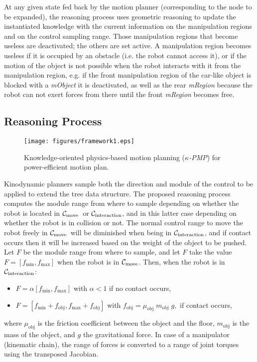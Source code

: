 \documentclass[twocolumn]{svjour3}          %
\newcommand {\Cint}{\hbox{{$\cal C_{\textrm{interaction}}$}}}                %
\newcommand {\Cmove}{\hbox{{$\cal C_{\textrm{move}}$}}}                %
\begin{document}
At any given state fed back by the motion planner (corresponding to the node to be expanded), the reasoning process uses
 geometric reasoning to update the instantiated knowledge with the current information on the manipulation regions and on the control sampling range.
Those manipulation regions  that become useless are deactivated; the others are set active.
A manipulation region becomes useless if it is occupied by an obstacle (i.e. the robot cannot access it), or if the motion of the object is not possible when the robot interacts with it from the manipulation region, e.g. if the front manipulation region of the car-like object is blocked with a \textit{mObject} it is deactivated, as well as the rear \textit{mRegion} because the robot can not exert forces from there until the front \textit{mRegion} becomes free. 
\subsection{Reasoning Process}\label{sec:reasoning}
\begin{figure}[t]
\begin{center}
   \texttt{[image: figures/framework1.eps]}
   \caption{Knowledge-oriented physics-based motion planning (\textit{$\kappa$-PMP}) for power-efficient motion plan.}\label{fig:framwork}
\end{center}
\end{figure}
Kinodynamic planners sample both the direction and module of the control to be applied to extend the tree data structure. The proposed reasoning process computes the module range from where to sample depending on whether the robot  is located in \Cmove\ or \Cint, and in this latter case depending on whether the robot is in collision or not.
The normal control range to move the robot  freely in \Cmove\ will be diminished when being in \Cint, and if contact occurs then it will be increased based on the weight of the object to be pushed.
Let $F$ be the module range from where to sample, and let $F$ take the value $F=[f_\textrm{min},f_\textrm{max}]$ when the robot is in \Cmove. Then, when the robot is in \Cint:
\begin{itemize}
\item $F=\alpha[f_\textrm{min},f_\textrm{max}]$ with $\alpha<1$ if no contact occurs,
\item $F=[f_\textrm{min}+f_\textrm{obj},f_\textrm{max}+f_\textrm{obj}]$ with $f_\textrm{obj}= \mu_\textrm{obj}\; m_\textrm{obj}\; g,$ if contact occurs,
\end{itemize}
where $\mu_\textrm{obj}$ is the friction coefficient between the object and the floor, $m_\textrm{obj}$ is the mass of the object, and $g$ the gravitational force.
In case of a manipulator (kinematic chain), the range of forces is converted to a range of joint torques using the transposed Jacobian.
\end{document}
